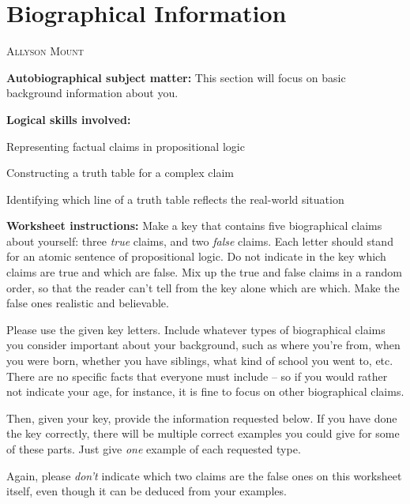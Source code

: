 \documentclass[oneside, openany]{book} %
\makeatletter
\newcommand\chapterauthor[1]{\authortoc{#1}\printchapterauthor{#1}}
\newcommand{\printchapterauthor}[1]{%
 {\parindent0pt\vspace*{-25pt}%
 \linespread{1.1}\large\scshape#1%
 \par\nobreak\vspace*{35pt}}
 \@afterheading%
}
\newcommand{\authortoc}[1]{%
 \addtocontents{toc}{\vskip-10pt}%
 \addtocontents{toc}{%
  \protect\contentsline{chapter}%
  {\hskip1.3em\mdseries\scshape\protect\scriptsize#1}{}{}}
 \addtocontents{toc}{\vskip5pt}%
}
\makeatother
\begin{document}
\chapter{Biographical Information}

\chapterauthor{Allyson Mount}

\noindent \textbf{Autobiographical subject matter: }This section will focus on basic background information about you.

\noindent

\noindent \textbf{Logical skills involved:}

\noindent

\noindent Representing factual claims in propositional logic

\noindent

\noindent Constructing a truth table for a complex claim

\noindent

\noindent Identifying which line of a truth table reflects the real-world situation

\noindent

\noindent

\noindent \textbf{Worksheet instructions: }Make a key that contains five biographical claims about yourself: three \textit{true }claims, and two \textit{false }claims. Each letter should 
stand for an atomic sentence of propositional logic. Do not indicate in the key which claims are true and which are false. Mix up the true and false claims in a random order, so that the 
reader can't tell from the key alone which are which. Make the false ones realistic and believable.

\noindent

\noindent Please use the given key letters. Include whatever types of biographical claims you consider important about your background, such as where you're from, when you were born, 
whether you have siblings, what kind of school you went to, etc. There are no specific facts that everyone must include -- so if you would rather not indicate your age, for instance, it 
is fine to focus on other biographical claims.

\noindent

\noindent Then, given your key, provide the information requested below. If you have done the key correctly, there will be multiple correct examples you could give for some of these 
parts. Just give \textit{one }example of each requested type.

\noindent

\noindent Again, please \textit{don't }indicate which two claims are the false ones on this worksheet itself, even though it can be deduced from your examples.
\end{document}
